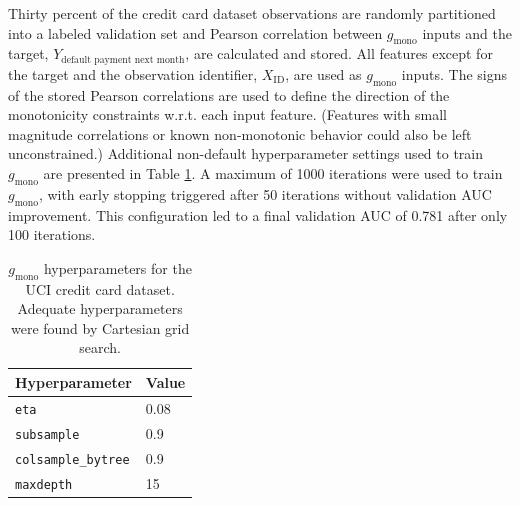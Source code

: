 \documentclass[sigconf]{acmart}
\begin{document}
Thirty percent of the credit card dataset observations are randomly partitioned into a labeled validation set and Pearson correlation between $g_{\text{mono}}$ inputs and the target, $Y_{\text{default payment next month}}$, are calculated and stored. All features except for the target and the observation identifier, $X_{\text{ID}}$, are used as $g_{\text{mono}}$ inputs. The signs of the stored Pearson correlations are used to define the direction of the monotonicity constraints w.r.t. each input feature. (Features with small magnitude correlations or known non-monotonic behavior could also be left unconstrained.) Additional non-default hyperparameter settings used to train $g_{\text{mono}}$ are presented in Table \ref{tab:mono_gbm}. A maximum of 1000 iterations were used to train $g_{\text{mono}}$, with early stopping triggered after 50 iterations without validation AUC improvement. This configuration led to a final validation AUC of 0.781 after only 100 iterations. 

\begin{table}[ht]
	\centering
	\caption{$g_{\text{mono}}$ hyperparameters for the UCI credit card dataset. Adequate hyperparameters were found by Cartesian grid search.}
	\begin{tabular}{ | p{3.5cm} | p{1.2cm} | }
	\hline
	Hyperparameter & Value \\ 
	\hline
	\texttt{eta} & 0.08 \\
	\hline	
	\texttt{subsample} & 0.9 \\
	\hline	
	\texttt{colsample\_bytree} & 0.9 \\
	\hline
	\texttt{maxdepth} & 15 \\	
	\hline
	\end{tabular}
	\label{tab:mono_gbm}
\end{table}	 
\end{document}

